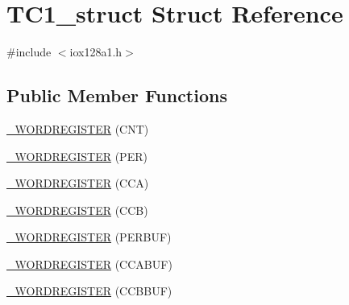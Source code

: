 \hypertarget{struct_t_c1__struct}{
\section{TC1\_\-struct Struct Reference}
\label{struct_t_c1__struct}
}


{\ttfamily \#include $<$iox128a1.h$>$}

\subsection*{Public Member Functions}
\begin{DoxyCompactItemize}
\item 
\hyperlink{struct_t_c1__struct_a56a4a694e8d3a5a93031d4079e5029a6}{\_\-WORDREGISTER} (CNT)
\item 
\hyperlink{struct_t_c1__struct_afc677a4de3554dbbc4855b5dec5b25d7}{\_\-WORDREGISTER} (PER)
\item 
\hyperlink{struct_t_c1__struct_abd40344150dc1e480b14e991c0659a9e}{\_\-WORDREGISTER} (CCA)
\item 
\hyperlink{struct_t_c1__struct_a501a06fcb0ab370a90303282122ea8c4}{\_\-WORDREGISTER} (CCB)
\item 
\hyperlink{struct_t_c1__struct_a5d7f8b5d159e3509deda5d83e306172d}{\_\-WORDREGISTER} (PERBUF)
\item 
\hyperlink{struct_t_c1__struct_add2485c86d0750a9d17603d69724cac4}{\_\-WORDREGISTER} (CCABUF)
\item 
\hyperlink{struct_t_c1__struct_ae2d3bc25815b7a7fdcffab11205c5da8}{\_\-WORDREGISTER} (CCBBUF)
\end{DoxyCompactItemize}
